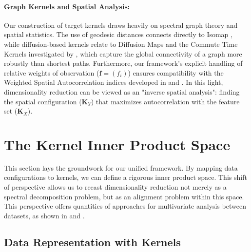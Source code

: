 \documentclass[11pt]{article}
\begin{document}
	\paragraph{Graph Kernels and Spatial Analysis:} Our construction of target kernels draws heavily on spectral graph theory and spatial statistics. The use of geodesic distances connects directly to Isomap \citep{tenenbaum_global_2000}, while diffusion-based kernels relate to Diffusion Maps \citep{coifman_diffusion_2006} and the Commute Time Kernels investigated by \citet{fouss_novel_2005}, which capture the global connectivity of a graph more robustly than shortest paths. Furthermore, our framework's explicit handling of relative weights of observation ($\mathbf{f} = (f_i)$) ensures compatibility with the Weighted Spatial Autocorrelation indices developed in \citet{bavaud_measuring_2024} and \citet{loup_spatial_2025}. In this light, dimensionality reduction can be viewed as an "inverse spatial analysis": finding the spatial configuration ($\mathbf{K}_Y$) that maximizes autocorrelation with the feature set ($\mathbf{K}_X$).
	
	
	\section{The Kernel Inner Product Space}
	\label{section:kernel_space}
	
	This section lays the groundwork for our unified framework. By mapping data configurations to kernels, we can define a rigorous inner product space. This shift of perspective allows us to recast dimensionality reduction not merely as a spectral decomposition problem, but as an alignment problem within this space. This perspective offers quantities of approaches for multivariate analysis between datasets, as shown in \citet{robert_unifying_1976} and \citet{bavaud_measuring_2024}.
	
	
	\subsection{Data Representation with Kernels}
	
\end{document}
